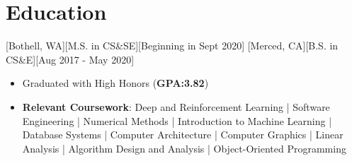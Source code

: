 \documentclass{article}
\begin{document}
%
%
%


\section{Education}
[Bothell, WA][M.S. in CS\&SE][Beginning in Sept 2020]
[Merced, CA][B.S. in CS\&E][Aug 2017 - May 2020]
\begin{itemize}
  \item Graduated with High Honors (\textbf{GPA:3.82})
  \item \textbf{Relevant Coursework}: Deep and Reinforcement Learning | Software Engineering | Numerical Methods | Introduction to Machine Learning | Database Systems | Computer Architecture | Computer Graphics | Linear Analysis | Algorithm Design and Analysis | Object-Oriented Programming
\end{itemize}
\end{document}
